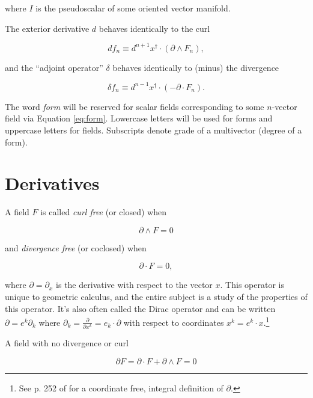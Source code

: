 \documentclass{article}
\begin{document}
where $I$ is the pseudoscalar of some oriented vector manifold.

The exterior derivative $d$ behaves identically to the curl

\begin{equation}
  d f_n \equiv d^{n+1}x^\dagger \cdot (\partial \wedge F_n),\label{eq:curl}
\end{equation}

and the ``adjoint operator'' $\delta$ behaves identically to (minus) the divergence

\begin{equation}
  \delta f_n \equiv d^{n-1}x^\dagger \cdot (-\partial \cdot F_n).\label{eq:divergence}
\end{equation} 

The word \emph{form} will be reserved for scalar fields corresponding to some $n$-vector field via Equation \ref{eq:form}. Lowercase letters will be used for forms and uppercase letters for fields. Subscripts denote grade of a multivector (degree of a form).

\section{Derivatives}

A field $F$ is called \emph{curl free} (or closed) when 

\begin{equation}
  \partial \wedge F = 0
\end{equation}

and \emph{divergence free} (or coclosed) when 

\begin{equation}
  \partial \cdot F = 0,
\end{equation}

where $\partial = \partial_x$ is the derivative with respect to the vector $x$. This operator is unique to geometric calculus, and the entire subject is a study of the properties of this operator. It's also often called the Dirac operator and can be written $\partial = e^k \partial_k$ where $\partial_k = \frac{\partial}{\partial x^k} = e_k \cdot \partial$ with respect to coordinates $x^k = e^k \cdot x$.\footnote{See p. 252 of \cite{cagc} for a coordinate free, integral definition of $\partial$.}

A field with no divergence or curl

\begin{equation}
  \partial F = \partial \cdot F + \partial \wedge F = 0
\end{equation}
\end{document}
